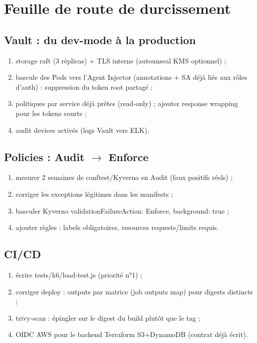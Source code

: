 \documentclass[12pt,a4paper,twoside,openright]{report}
\begin{document}
\chapter{Feuille de route de durcissement}

\section{Vault : du dev-mode à la production}
\begin{enumerate}[itemsep=1pt]
  \item storage raft (3 réplicas) + TLS interne (autounseal KMS optionnel) ;
  \item bascule des Pods vers l'Agent Injector (annotations + SA déjà liés aux rôles d'auth) : suppression du token root partagé ;
  \item politiques par service déjà prêtes (read-only) ; ajouter response wrapping pour les tokens courts ;
  \item audit devices activés (logs Vault vers ELK).
\end{enumerate}

\section{Policies : Audit $\rightarrow$ Enforce}
\begin{enumerate}[itemsep=1pt]
  \item mesurer 2 semaines de conftest/Kyverno en Audit (faux positifs réels) ;
  \item corriger les exceptions légitimes dans les manifests ;
  \item basculer Kyverno validationFailureAction: Enforce, background: true ;
  \item ajouter règles : labels obligatoires, resources requests/limits requis.
\end{enumerate}

\section{CI/CD}
\begin{enumerate}[itemsep=1pt]
  \item écrire tests/k6/load-test.js (priorité n°1) ;
  \item corriger deploy : outputs par matrice (job outputs map) pour digests distincts ;
  \item trivy-scan : épingler sur le digest du build plutôt que le tag ;
  \item OIDC AWS pour le backend Terraform S3+DynamoDB (contrat déjà écrit).
\end{enumerate}
\end{document}
